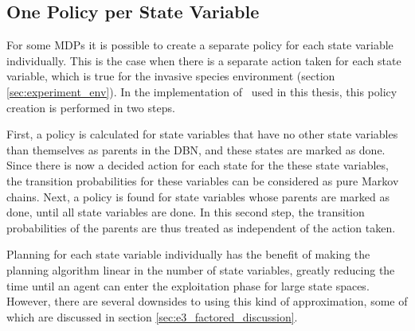 \subsection{One Policy per State Variable }
\label{sec:one_policy_per_state_variable}
For some MDPs it is possible to create a separate policy for each state variable individually. This is the case when there is a separate action taken for each state variable, which is true for the invasive species environment (section \ref{sec:experiment_env}). In the implementation of \etre\ used in this thesis, this policy creation is performed in two steps. 

First, a policy is calculated for state variables that have no other state variables than themselves as parents in the DBN, and these states are marked as done. Since there is now a decided action for each state for the these state variables, the transition probabilities for these variables can be considered as pure Markov chains. Next, a policy is found for state variables whose parents are marked as done, until all state variables are done. In this second step, the transition probabilities of the parents are thus treated as independent of the action taken. 

Planning for each state variable individually has the benefit of making the planning algorithm linear in the number of state variables, greatly reducing the time until an agent can enter the exploitation phase for large state spaces. However, there are several downsides to using this kind of approximation, some of which are discussed in section \ref{sec:e3_factored_discussion}.